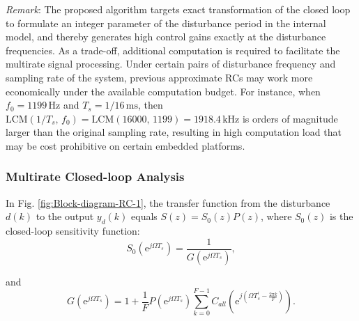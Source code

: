 \documentclass [11pt, proquest] {uwthesis}[2020/02/24]
\begin{document}
\emph{Remark}: The proposed algorithm targets exact transformation
of the closed loop to formulate an integer parameter of the disturbance
period in the internal model, and thereby generates high control gains
exactly at the disturbance frequencies. As a trade-off, additional
computation is required to facilitate the multirate signal processing.
Under certain pairs of disturbance frequency and sampling rate of
the system, previous approximate RCs may work more economically under
the available computation budget. For instance, when $f_{0}=1199\,\text{Hz}$
and $T_{s}=1/16\,\text{ms}$, then $\text{LCM}(1/T_{s},\,f_{0})=\text{LCM}(16000,\,1199)=1918.4\,\text{kHz}$
is orders of magnitude larger than the original sampling rate, resulting
in high computation load that may be cost prohibitive on certain embedded
platforms.

\subsubsection{Multirate Closed-loop Analysis} \label{sssec:Multirate-closed-loop-analysis}

In Fig. \ref{fig:Block-diagram-RC-1}, the transfer function from
the disturbance $d(k)$ to the output $y_{d}(k)$ equals $S(z)=S_{0}(z)P(z)$,
where $S_{0}(z)$ is the closed-loop sensitivity function:
\begin{equation}
S_{0}(\text{e}^{j\Omega T_{s}})=\frac{1}{G(\text{e}^{j\Omega T_{s}})},\label{eq:S}
\end{equation}

\noindent and
\begin{equation}
G(\text{e}^{j\Omega T_{s}})=1+\frac{1}{F}P(\text{e}^{j\Omega T_{s}})\sum_{k=0}^{F-1}C_{all}(\text{e}^{j(\Omega T_{s}^{'}-\frac{2\pi k}{F})}).\label{eq:G}
\end{equation}
\end{document}
